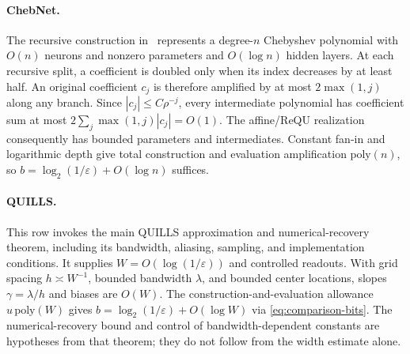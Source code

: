 \paragraph{ChebNet.}
The recursive construction in~\cite{tang2019chebnet} represents a degree-$n$
Chebyshev polynomial with $O(n)$ neurons and nonzero parameters and
$O(\log n)$ hidden layers. At each recursive split, a coefficient is doubled
only when its index decreases by at least half. An original coefficient
$c_j$ is therefore amplified by at most $2\max(1,j)$ along any branch.
Since $|c_j|\le C\rho^{-j}$, every intermediate polynomial has coefficient
sum at most $2\sum_j\max(1,j)|c_j|=O(1)$.
The affine/ReQU realization consequently has bounded parameters and
intermediates. Constant fan-in and logarithmic depth give total construction
and evaluation amplification $\mathrm{poly}(n)$, so
$b=\log_2(1/\varepsilon)+O(\log n)$ suffices.

\paragraph{QUILLS.}
This row invokes the main QUILLS approximation and numerical-recovery
theorem, including its bandwidth, aliasing, sampling, and implementation
conditions. It supplies $W=O(\log(1/\varepsilon))$ and controlled readouts.
With grid spacing $h\asymp W^{-1}$, bounded bandwidth $\lambda$, and bounded
center locations, slopes $\gamma=\lambda/h$ and biases are $O(W)$.
The construction-and-evaluation allowance $u\,\mathrm{poly}(W)$ gives
$b=\log_2(1/\varepsilon)+O(\log W)$ via
\eqref{eq:comparison-bits}. The numerical-recovery bound and control of
bandwidth-dependent constants are hypotheses from that theorem; they do not
follow from the width estimate alone.
